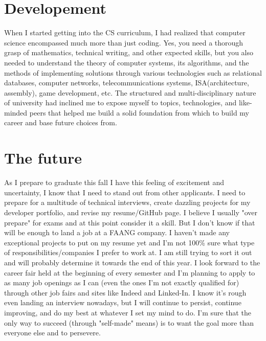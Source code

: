 \documentclass[notitlepage,a4paper,oneside,article,table]{article}
\begin{document}
\section{Developement}
When I started getting into the CS curriculum, I had realized that computer science encompassed much more than just coding. Yes, you need a thorough grasp of mathematics, technical writing, and other expected skills, but you also needed to understand the theory of computer systems, its algorithms, and the methods of implementing solutions through various technologies such as relational databases, computer networks, telecommunications systems, ISA(architecture, assembly), game development, etc. The structured and multi-disciplinary nature of university had inclined me to expose myself to topics, technologies, and like-minded peers that helped me build a solid foundation from which to build my career and base future choices from. 

\section {The future}
As I prepare to graduate this fall I have this feeling of excitement and uncertainty, I know that I need to stand out from other applicants. I need to prepare for a multitude of technical interviews, 
create dazzling projects for my developer portfolio, and revise my resume/GitHub page. I believe I usually "over prepare" for exams and at this point consider it a skill. But I don't know if that will be enough to land a job at a FAANG company. I haven't made any exceptional projects to put on my resume yet and I'm not 100\% sure what type of responsibilities/companies I prefer to work at. I am still trying to sort it out and will probably determine it towards the end of this year. I look forward to the career fair held at the beginning of every semester and I'm planning to apply to as many job openings as I can (even the ones I'm not exactly qualified for) through other job fairs and sites like Indeed and Linked-In. I know it's rough even landing an interview nowadays, but I will continue to persist, continue improving, and do my best at whatever I set my mind to do. I'm sure that the only way to succeed (through "self-made" means) is to want the goal more than everyone else and to persevere.
\end{document}
